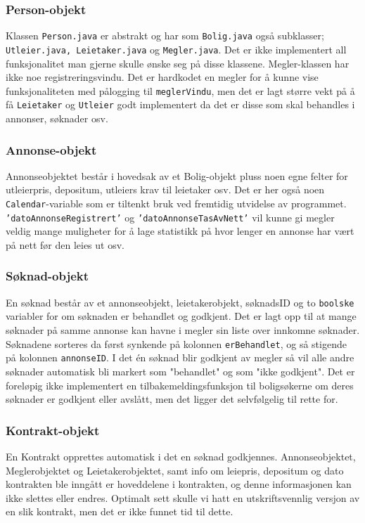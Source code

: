 \subsubsection{Person-objekt}
Klassen \texttt{Person.java} er abstrakt og har som \texttt{Bolig.java} også subklasser; \texttt{Utleier.java, Leietaker.java} og \texttt{Megler.java}.
Det er ikke implementert all funksjonalitet man gjerne skulle ønske seg på disse klassene. Megler-klassen har ikke noe registreringsvindu. Det er hardkodet en megler for å kunne vise funksjonaliteten med pålogging til \texttt{meglerVindu}, men det er lagt større vekt på å få \texttt{Leietaker} og \texttt{Utleier} godt implementert da det er disse som skal behandles i annonser, søknader osv.

\subsubsection{Annonse-objekt}
Annonseobjektet består i hovedsak av et Bolig-objekt pluss noen egne felter for utleierpris, depositum, utleiers krav til leietaker osv.
Det er her også noen \texttt{Calendar}-variable som er tiltenkt bruk ved fremtidig utvidelse av programmet. \texttt{'datoAnnonseRegistrert'} og \texttt{'datoAnnonseTasAvNett'} vil kunne gi megler veldig mange muligheter for å lage statistikk på hvor lenger en annonse har vært på nett før den leies ut osv. 

\subsubsection{Søknad-objekt}
En søknad består av et annonseobjekt, leietakerobjekt, søknadsID og to \texttt{boolske} variabler for om søknaden er behandlet og godkjent.
Det er lagt opp til at mange søknader på samme annonse kan havne i megler sin liste over innkomne søknader. Søknadene sorteres da først synkende på kolonnen \texttt{erBehandlet}, og så stigende på kolonnen \texttt{annonseID}.
I det én søknad blir godkjent av megler så vil alle andre søknader automatisk bli markert som "behandlet" og som "ikke godkjent". 
Det er foreløpig ikke implementert en tilbakemeldingsfunksjon til boligsøkerne om deres søknader er godkjent eller avslått, men det ligger det selvfølgelig til rette for.

\subsubsection{Kontrakt-objekt}
En Kontrakt opprettes automatisk i det en søknad godkjennes. Annonseobjektet, Meglerobjektet og Leietakerobjektet, samt info om leiepris, depositum og dato kontrakten ble inngått er hoveddelene i kontrakten, og denne informasjonen kan ikke slettes eller endres. 
Optimalt sett skulle vi hatt en utskriftsvennlig versjon av en slik kontrakt, men det er ikke funnet tid til dette. 



